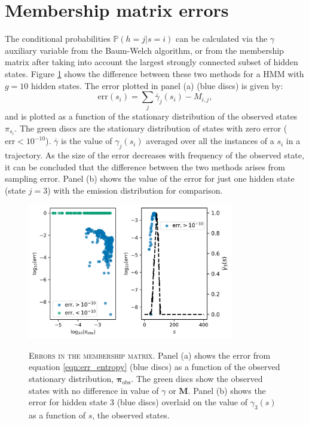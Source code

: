 \section{Membership matrix errors}\label{sec:app_membership_errors}

The conditional probabilities $\mathbb{P}(h=j|s=i)$ can be calculated via the $\gamma$ auxiliary variable from the Baum-Welch algorithm\cite{baumMaximizationTechniqueOccurring1970, welch2003hidden}, or from the membership matrix after taking into account the largest strongly connected subset of hidden states.  Figure \ref{fig:membership_error} shows the difference between these two methods for a HMM with $g=10$ hidden states.  The error plotted in panel (a) (blue discs) is given by:
\begin{equation}\label{eqn:err_entropy}
\mathrm{err}(s_{i}) = \sum_j\bar{\gamma}_{j}(s_{i}) - M_{i, j}, 
\end{equation}
and is plotted as a function of the stationary distribution of the observed states $\pi_{s_{i}}$. The green discs are the stationary distribution of states with zero error ($\mathrm{err}<10^{-10}$). $\bar{\gamma}$ is the value of $\gamma_{j}(s_{i})$ averaged over all the instances of a $s_{i}$ in a trajectory. As the size of the error decreases with frequency of the observed state, it can be concluded that the difference between the two methods arises from sampling error. Panel (b) shows the value of the error for just one hidden state (state $j=3$) with the emission distribution for comparison. 
\begin{figure}
    \centering
    \caption[Errors in the membership matrix]{\textsc{Errors in the membership matrix}. Panel (a) shows the error from equation \ref{eqn:err_entropy} (blue discs) as a function of the observed stationary distribution, $\bm{\pi}_{\mathrm{obs}}$. The green discs show the observed states with no difference in value of $\gamma$ or $\mathbf{M}$. Panel (b) shows the error for hidden state $3$ (blue discs) overlaid on the value of $\gamma_{3}(s)$ as a function of $s$, the observed states.}
    \includegraphics[width=0.8\textwidth]{chapters/hmm_selection/figures/entropy_error_explanation.png}
    \label{fig:membership_error}
\end{figure}


